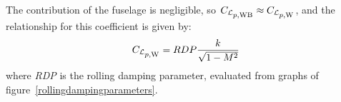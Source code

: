 The contribution of the fuselage is negligible, so $\CLprateWB \approx \CLprateW$, and the relationship for this coefficient is given by:
\begin{equation}
\label{eq:rollrollrateW}
\CLprateW = RDP \frac{k}{\sqrt{1 - M^2}}
\end{equation}
where \emph{RDP} is the rolling damping parameter, evaluated from graphs of figure~\vref{rollingdampingparameters}.

\begin{figure}[H] 
\centering
{}
 \\
\subfloat[]

\end{figure}
